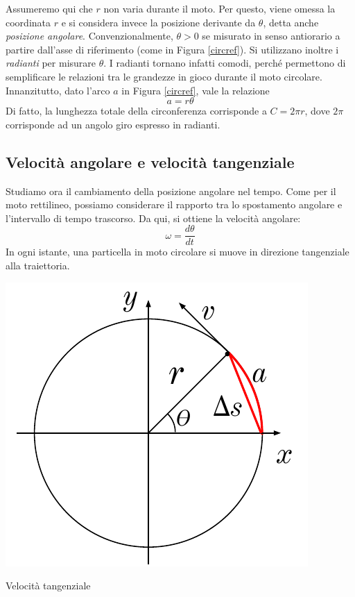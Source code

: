 Assumeremo qui che $r$ non varia durante il moto. Per questo, viene omessa
la coordinata $r$ e si considera invece la posizione derivante da $\theta$,
detta anche \textit{posizione angolare}. Convenzionalmente, $\theta > 0$ se
misurato in senso antiorario a partire dall'asse di riferimento (come in
Figura \ref{circref}). Si utilizzano inoltre i \textit{radianti} per misurare
$\theta$. I radianti tornano infatti comodi, perché permettono di semplificare
le relazioni tra le grandezze in gioco durante il moto circolare. Innanzitutto,
dato l'arco $a$ in Figura \ref{circref}, vale la relazione \[ a = r\theta \]
Di fatto, la lunghezza totale della circonferenza corrisponde a $C = 2\pi r$,
dove $2\pi$ corrisponde ad un angolo giro espresso in radianti.

\subsection{Velocità angolare e velocità tangenziale}
Studiamo ora il cambiamento della posizione angolare nel tempo. Come per il
moto rettilineo, possiamo considerare il rapporto tra lo spostamento angolare
e l'intervallo di tempo trascorso. Da qui, si ottiene la velocità angolare:
\[ \omega = \frac{d\theta}{dt} \]
In ogni istante, una particella in moto circolare si muove in direzione
tangenziale alla traiettoria.
\begin{marginfigure}
    \centering
    \includegraphics[width = \marginparwidth]{figures/circspeed.pdf}
    \caption{Velocità tangenziale}
    \label{circspeed}
\end{marginfigure}
